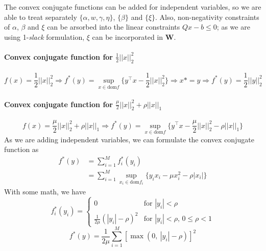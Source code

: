 \documentclass[10pt,letterpaper]{article}
\newcommand{\+}[1]{\ensuremath{{\boldsymbol #1}}}
\begin{document}
The convex conjugate functions can be added for independent variables, so we are able to treat separately $\{\alpha,w,\gamma,\eta\}$,  $\{\beta\}$ and $\{\xi\}$. Also, non-negativity constraints of $\alpha$, $\beta$ and $\xi$ can be arsorbed into the linear constraints $Qx-b \le 0$; as we are using 1-\emph{slack} formulation, $\xi$ can be incorporated in $\+W$. 
\paragraph{Convex conjugate function for $\frac{1}{2}||x||_2^2$}
\begin{equation}
f(x) = \frac{1}{2}||x||_2^2 \Rightarrow f^*(y) = \sup_{x \in \text{dom$f$}}\{y^\top x-\frac{1}{2}||x||_2^2\} \Rightarrow x* = y \Rightarrow f^*(y) = \frac{1}{2}||y||_2^2
\end{equation}
\paragraph{Convex conjugate function for $\frac{\mu}{2}||x||_2^2 + \rho||x||_1$}
\begin{equation}
f(x) = \frac{\mu}{2}||x||_2^2 + \rho||x||_1 \Rightarrow f^*(y) = \sup_{x \in \text{dom$f$}}\{y^\top x-\frac{\mu}{2}||x||_2^2 - \rho||x||_1\} 
\end{equation}
As we are adding independent variables, we can formulate the convex conjugate function as
\begin{equation}
\begin{split}
f^*(y) & = \sum_{i=1}^M f_i^*(y_i) \\
& = \sum_{i=1}^M \sup_{x_i \in \text{dom$f_i$}}\{y_ix_i - \mu x_i^2 - \rho |x_i|\}
\end{split}
\end{equation}
With some math, we have
\begin{equation}
 f_i^*(y_i) = \begin{cases} 0 & \mbox{for } |y_i| <  \rho \\ \frac{1}{2\mu}(|y_i| - \rho)^2 & \mbox{for }|y_i| <  \rho \mbox{, }0 \le \rho < 1 \end{cases} 
\end{equation}
\begin{equation}
f^*(y) = \frac{1}{2\mu} \sum_{i=1}^M \left[\max (0,~|y_i|-\rho)\right]^2
\end{equation}
\end{document}
